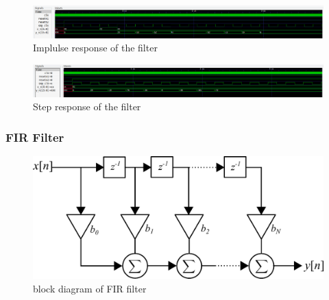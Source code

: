\documentclass{beamer}
\begin{document}
\begin{frame}

		\begin{figure}[h!]
  		\centering
    			\includegraphics[width=\linewidth]{./figs/band_impulse.png}
		\caption{Implulse response of the filter}
		\end{figure}	
		\begin{figure}[h!]
  		\centering
    			\includegraphics[width=\linewidth]{./figs/band_step.png}
		\caption{Step response of the filter}
		\end{figure}	
\end{frame}

\begin{frame}
	\frametitle{FIR Filter}
		\begin{figure}[h!]
  		\centering
    			\includegraphics[width=0.7\linewidth]{./figs/fir.png}
		\caption{block diagram of FIR filter}
		\end{figure}	
\end{frame}
\end{document}
